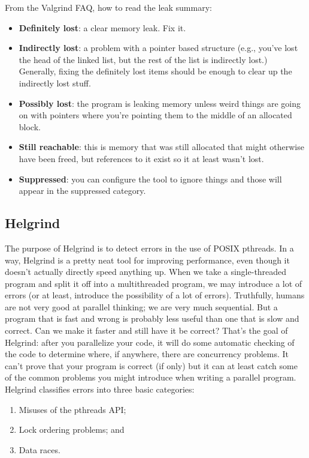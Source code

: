 \documentclass[a4paper]{report}
\begin{document}
From the Valgrind FAQ, how to read the leak summary:
\begin{itemize}
	\item \textbf{Definitely lost}: a clear memory leak. Fix it.
	\item \textbf{Indirectly lost}: a problem with a pointer based structure (e.g., you've lost the head of the linked list, but the rest of the list is indirectly lost.) Generally, fixing the definitely lost items should be enough to clear up the indirectly lost stuff.
	\item \textbf{Possibly lost}: the program is leaking memory unless weird things are going on with pointers where you're pointing them to the middle of an allocated block.
	\item \textbf{Still reachable}: this is memory that was still allocated that might otherwise have been freed, but references to it exist so it at least wasn't lost.
	\item \textbf{Suppressed}: you can configure the tool to ignore things and those will appear in the suppressed category.
\end{itemize}



\subsection*{Helgrind}
The purpose of Helgrind is to detect errors in the use of POSIX pthreads. In a way, Helgrind is a pretty neat tool for improving performance, even though it doesn't actually directly speed anything up. When we take a single-threaded program and split it off into a multithreaded program, we may introduce a lot of errors (or at least, introduce the possibility of a lot of errors). Truthfully, humans are not very good at parallel thinking; we are very much sequential. But a program that is fast and wrong is probably less useful than one that is slow and correct. Can we make it faster and still have it be correct? That's the goal of Helgrind: after you parallelize your code, it will do some automatic checking of the code to determine where, if anywhere, there are concurrency problems. It can't prove that your program is correct (if only) but it can at least catch some of the common problems you might introduce when writing a parallel program. Helgrind classifies errors into three basic categories:

\begin{enumerate}[noitemsep]
	\item Misuses of the pthreads API;
	\item Lock ordering problems; and
	\item Data races.
\end{enumerate}
\end{document}
